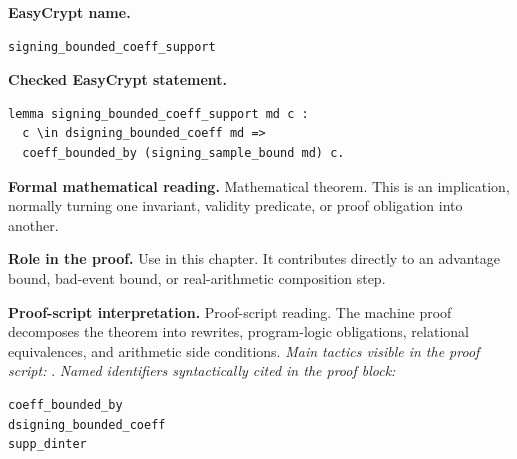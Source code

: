 \begin{formaltheorem}
\noindent\textbf{EasyCrypt name.}
\begin{lstlisting}[language=EasyCrypt,basicstyle=\ttfamily\scriptsize]
signing_bounded_coeff_support
\end{lstlisting}
\noindent\textbf{Checked EasyCrypt statement.}
\begin{lstlisting}[language=EasyCrypt,basicstyle=\ttfamily\scriptsize]
lemma signing_bounded_coeff_support md c :
  c \in dsigning_bounded_coeff md =>
  coeff_bounded_by (signing_sample_bound md) c.
\end{lstlisting}
\noindent\textbf{Formal mathematical reading.}
Mathematical theorem. This is an implication, normally turning one invariant, validity predicate, or proof obligation into another.

\noindent\textbf{Role in the proof.}
Use in this chapter. It contributes directly to an advantage bound, bad-event bound, or real-arithmetic composition step.

\noindent\textbf{Proof-script interpretation.}
Proof-script reading. The machine proof decomposes the theorem into rewrites, program-logic obligations, relational equivalences, and arithmetic side conditions.
\emph{Main tactics visible in the proof script:} .
\emph{Named identifiers syntactically cited in the proof block:}
\begin{lstlisting}[language=EasyCrypt,basicstyle=\ttfamily\scriptsize]
coeff_bounded_by
dsigning_bounded_coeff
supp_dinter
\end{lstlisting}

\end{formaltheorem}

